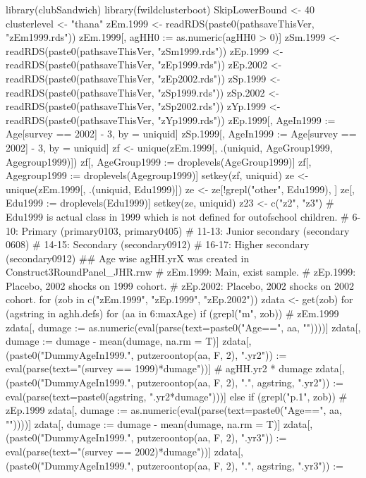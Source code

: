 \begin{Schunk}
\begin{Sinput}
library(clubSandwich)
library(fwildclusterboot)
SkipLowerBound <- 40
clusterlevel <- "thana"
zEm.1999 <- readRDS(paste0(pathsaveThisVer, "zEm1999.rds"))
zEm.1999[, agHH0 :=  as.numeric(agHH0 > 0)]
zSm.1999 <- readRDS(paste0(pathsaveThisVer, "zSm1999.rds"))
zEp.1999 <- readRDS(paste0(pathsaveThisVer, "zEp1999.rds"))
zEp.2002 <- readRDS(paste0(pathsaveThisVer, "zEp2002.rds"))
zSp.1999 <- readRDS(paste0(pathsaveThisVer, "zSp1999.rds"))
zSp.2002 <- readRDS(paste0(pathsaveThisVer, "zSp2002.rds"))
zYp.1999 <- readRDS(paste0(pathsaveThisVer, "zYp1999.rds"))
zEp.1999[, AgeIn1999 := Age[survey == 2002] - 3, by = uniquid]
zSp.1999[, AgeIn1999 := Age[survey == 2002] - 3, by = uniquid]
zf <- unique(zEm.1999[, .(uniquid, AgeGroup1999, Agegroup1999)])
zf[, AgeGroup1999 := droplevels(AgeGroup1999)]
zf[, Agegroup1999 := droplevels(Agegroup1999)]
setkey(zf, uniquid)
ze <- unique(zEm.1999[, .(uniquid, Edu1999)])
ze <- ze[!grepl("other", Edu1999), ]
ze[, Edu1999 := droplevels(Edu1999)]
setkey(ze, uniquid)
z23 <- c("z2", "z3")
# Edu1999 is actual class in 1999 which is not defined for outofschool children.
#    6-10: Primary (primary0103, primary0405)
#  11-13: Junior secondary (secondary 0608)
#  14-15: Secondary (secondary0912)
#  16-17: Higher secondary (secondary0912)
## Age wise agHH.yrX was created in Construct3RoundPanel_JHR.rnw
#  zEm.1999: Main, exist sample.
#  zEp.1999: Placebo, 2002 shocks on 1999 cohort.
#  zEp.2002: Placebo, 2002 shocks on 2002 cohort.
for (zob in c("zEm.1999", "zEp.1999", "zEp.2002")) {
  zdata <- get(zob)
  for (agstring in aghh.defs) {
    for (aa in 6:maxAge) {
      if (grepl("m", zob)) # zEm.1999
      {
        zdata[, dumage := as.numeric(eval(parse(text=paste0("Age==", aa, ""))))]
        zdata[, dumage := dumage - mean(dumage, na.rm = T)]
        zdata[, (paste0("DummyAgeIn1999.", putzeroontop(aa, F, 2), ".yr2")) :=
          eval(parse(text="(survey == 1999)*dumage"))] 
        # agHH.yr2 * dumage
        zdata[, (paste0("DummyAgeIn1999.", putzeroontop(aa, F, 2), ".", agstring, ".yr2")) :=
          eval(parse(text=paste0(agstring, ".yr2*dumage")))] 
      } else if (grepl("p.1", zob)) # zEp.1999
      {
        zdata[, dumage := as.numeric(eval(parse(text=paste0("Age==", aa, ""))))]
        zdata[, dumage := dumage - mean(dumage, na.rm = T)]
        zdata[, (paste0("DummyAgeIn1999.", putzeroontop(aa, F, 2), ".yr3")) :=
          eval(parse(text="(survey == 2002)*dumage"))] 
        zdata[, (paste0("DummyAgeIn1999.", putzeroontop(aa, F, 2), ".", agstring, ".yr3")) :=
}}}}
\end{Sinput}
\end{Schunk}
